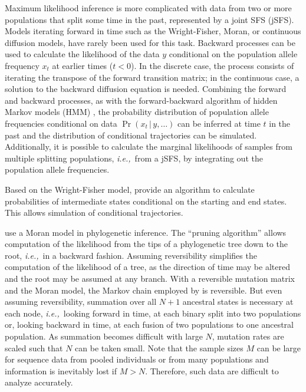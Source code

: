 \documentclass[preprint]{elsarticle}
\newcommand\given{{\,|\,}}
\newcommand\ie{{\it i.e.,}}
\newcommand\x[1]{\ensuremath{x_{#1}}}
\newcommand\y{\ensuremath{y}}
\begin{document}
Maximum likelihood inference is more complicated with data from two or more populations that split some time in the past, represented by a joint SFS (jSFS). Models iterating forward in time such as the Wright-Fisher, Moran, or continuous diffusion models, have rarely been used for this task. Backward processes can be used to calculate the likelihood of the data $\y$ conditional on the population allele frequency $\x{t}$  at earlier times ($t<0$). In the discrete case, the process consists of iterating the transpose of the forward transition matrix; in the continuous case, a solution to the backward diffusion equation is needed. Combining the forward and backward processes, as with the forward-backward algorithm of hidden Markov models (HMM) \citep{Rabi86}, the probability distribution of population allele frequencies conditional on data $\Pr(\x{t}\given \y,\dots)$ can be inferred at time $t$ in the past and the distribution of conditional trajectories can be simulated. Additionally, it is possible to calculate the marginal likelihoods of samples from multiple splitting populations, \ie\ from a jSFS, by integrating out the population allele frequencies.

Based on the Wright-Fisher model, \citet{Zhao14} provide an algorithm to calculate probabilities of intermediate states conditional on the starting and end states. This allows simulation of conditional trajectories. 

\citet{Schrempf2016} use a Moran model in phylogenetic inference. The ``pruning algorithm'' \citep{Fels81} allows computation of the likelihood from the tips of a phylogenetic tree down to the root, \ie\ in a backward fashion. Assuming reversibility simplifies the computation of the likelihood of a tree, as the direction of time may be altered and the root may be assumed at any branch. With a reversible mutation matrix and the Moran model, the Markov chain employed by \citet{Schrempf2016} is reversible. But even assuming reversibility, summation over all $N+1$ ancestral states is necessary at each node, \ie\ looking forward in time, at each binary split into two populations or, looking backward in time, at each fusion of two populations to one ancestral population. As summation becomes difficult with large $N$, mutation rates are scaled such that $N$ can be taken small. Note that the sample sizes $M$ can be large for sequence data from pooled individuals or from many populations and information is inevitably lost if $M>N$. Therefore, such data are  difficult to analyze accurately. 
\end{document}

